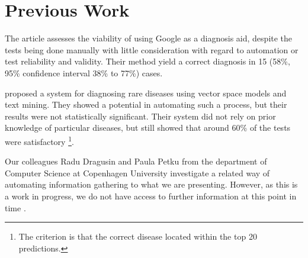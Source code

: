 \documentclass[10pt,letterpaper,two column,final]{article}
\begin{document}
\section{Previous Work}
\label{chap:previouswork}
The article \cite{googlingdiagnosis} assesses the viability of using
Google as a diagnosis aid, despite the tests being done manually with
little consideration with regard to automation or test reliability and
validity. Their method yield a correct diagnosis in 15 (58\%, 95\%
confidence interval 38\% to 77\%) cases.


\cite{jensenandersen} proposed a system for diagnosing rare diseases
using vector space models and text mining. They showed a potential in
automating such a process, but their results were not statistically
significant. Their system did not rely on prior knowledge of particular
diseases, but still showed that around 60\% of the tests were
satisfactory \footnote{The criterion is that the correct disease located
within the top 20 predictions.}.

Our colleagues Radu Dragusin and Paula Petku from the department of
Computer Science at Copenhagen University investigate a related way of
automating information gathering to what we are presenting. However, as
this is a work in progress, we do not have access to further information
at this point in time \cite{radupaula}.







\end{document}
